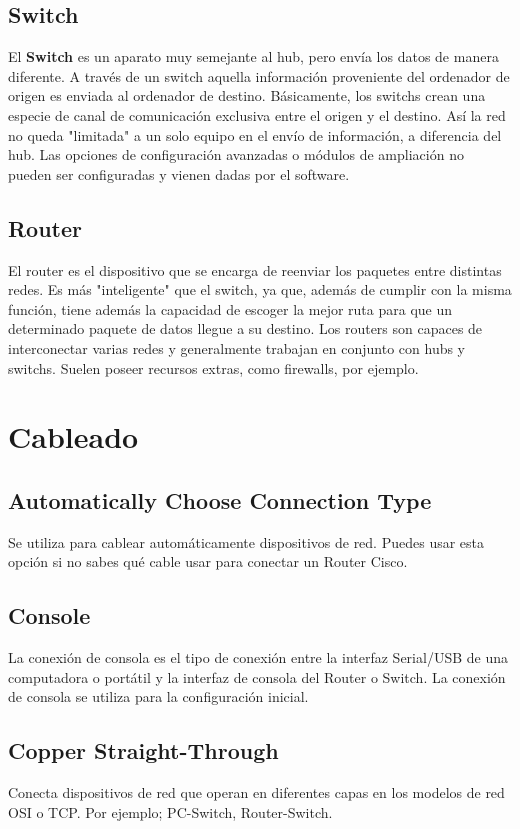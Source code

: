 \documentclass[]{article}
\begin{document}
\subsection{Switch}
El \textbf{Switch} es un aparato muy semejante al hub, pero envía los datos de manera diferente. A través de un switch aquella información proveniente del ordenador de origen es enviada al ordenador de destino.
Básicamente, los switchs crean una especie de canal de comunicación exclusiva entre el origen y el destino. Así la red no queda "limitada" a un solo equipo en el envío de información, a diferencia del hub. Las opciones de configuración avanzadas o módulos de ampliación no pueden ser configuradas y vienen dadas por el software.

\subsection{Router}
El router es el dispositivo que se encarga de reenviar los paquetes entre distintas redes. Es más "inteligente" que el switch, ya que, además de cumplir con la misma función, tiene además la capacidad de escoger la mejor ruta para que un determinado paquete de datos llegue a su destino. Los routers son capaces de interconectar varias redes y generalmente trabajan en conjunto con hubs y switchs. Suelen poseer recursos extras, como firewalls, por ejemplo.

\section{Cableado}

\subsection{Automatically Choose Connection Type}
	Se utiliza para cablear automáticamente dispositivos de red. Puedes usar esta opción si no sabes qué cable usar para conectar un Router Cisco.
	
\subsection{Console}
La conexión de consola es el tipo de conexión entre la interfaz Serial/USB de una computadora o portátil y la interfaz de consola del Router o Switch. La conexión de consola se utiliza para la configuración inicial.

\subsection{Copper Straight-Through}
Conecta dispositivos de red que operan en diferentes capas en los modelos de red OSI o TCP. Por ejemplo; PC-Switch, Router-Switch.
\end{document}
